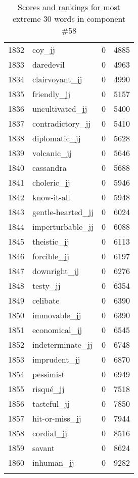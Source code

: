 \begin{longtable}[!htbp]{| rlr@{.}l |}
    1832 & coy\_jj & 0 & 4885 \\
    1833 & daredevil & 0 & 4963 \\
    1834 & clairvoyant\_jj & 0 & 4990 \\
    1835 & friendly\_jj & 0 & 5157 \\
    1836 & uncultivated\_jj & 0 & 5400 \\
    1837 & contradictory\_jj & 0 & 5410 \\
    1838 & diplomatic\_jj & 0 & 5628 \\
    1839 & volcanic\_jj & 0 & 5646 \\
    1840 & cassandra & 0 & 5688 \\
    1841 & choleric\_jj & 0 & 5946 \\
    1842 & know-it-all & 0 & 5948 \\
    1843 & gentle-hearted\_jj & 0 & 6024 \\
    1844 & imperturbable\_jj & 0 & 6088 \\
    1845 & theistic\_jj & 0 & 6113 \\
    1846 & forcible\_jj & 0 & 6197 \\
    1847 & downright\_jj & 0 & 6276 \\
    1848 & testy\_jj & 0 & 6354 \\
    1849 & celibate & 0 & 6390 \\
    1850 & immovable\_jj & 0 & 6390 \\
    1851 & economical\_jj & 0 & 6545 \\
    1852 & indeterminate\_jj & 0 & 6748 \\
    1853 & imprudent\_jj & 0 & 6870 \\
    1854 & pessimist & 0 & 6949 \\
    1855 & risqué\_jj & 0 & 7518 \\
    1856 & tasteful\_jj & 0 & 7850 \\
    1857 & hit-or-miss\_jj & 0 & 7944 \\
    1858 & cordial\_jj & 0 & 8516 \\
    1859 & savant & 0 & 8624 \\
    1860 & inhuman\_jj & 0 & 9282 \\
    \hline
    \caption{Scores and rankings for most extreme 30 words in component \#58} \\
\end{longtable}
